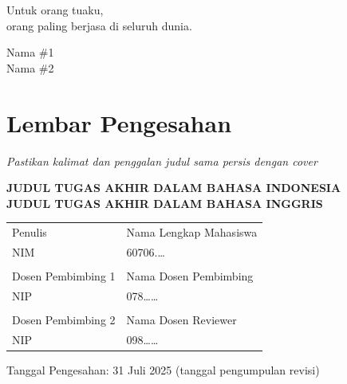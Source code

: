 \documentclass[a4paper,11pt,oneside]{report}
\begin{document}
\begin{center}
    Untuk orang tuaku,\\
    orang paling berjasa di seluruh dunia.
\end{center}

\vspace{3cm}
\begin{flushleft}
    Nama \#1\\
    Nama \#2
\end{flushleft}

\chapter*{Lembar Pengesahan}

\noindent\textit{Pastikan kalimat dan penggalan judul sama persis dengan cover}

\begin{center}
    {\bfseries JUDUL TUGAS AKHIR DALAM BAHASA INDONESIA}\\[6pt]
    {\bfseries JUDUL TUGAS AKHIR DALAM BAHASA INGGRIS}
\end{center}

\vspace{1cm}
\begin{table}[h]
    \centering
    \begin{tabular}{p{4cm}p{8cm}}
        Penulis                 & Nama Lengkap Mahasiswa \\
        NIM                     & 60706.\ldots \\
        \multicolumn{2}{c}{} \\
        Dosen Pembimbing 1      & Nama Dosen Pembimbing \\
        NIP                     & 078\ldots\ldots \\
        \multicolumn{2}{c}{} \\
        Dosen Pembimbing 2      & Nama Dosen Reviewer \\
        NIP                     & 098\ldots\ldots \\
    \end{tabular}
\end{table}

\vspace{2cm}
\begin{center}
    Tanggal Pengesahan: 31 Juli 2025 (tanggal pengumpulan revisi)
\end{center}
\end{document}
